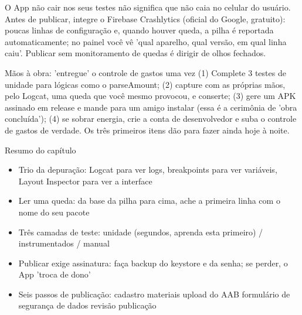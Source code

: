 
O App não cair nos seus testes não significa que não caia no celular do usuário. Antes de publicar, integre o Firebase Crashlytics (oficial do Google, gratuito): poucas linhas de configuração e, quando houver queda, a pilha é reportada automaticamente; no painel você vê 'qual aparelho, qual versão, em qual linha caiu'. Publicar sem monitoramento de quedas é dirigir de olhos fechados.

\begin{tcbpractice}{Mãos à obra: 'entregue' o controle de gastos uma vez}
(1) Complete 3 testes de unidade para lógicas como o parseAmount; (2) capture com as próprias mãos, pelo Logcat, uma queda que você mesmo provocou, e conserte; (3) gere um APK assinado em release e mande para um amigo instalar (essa é a cerimônia de 'obra concluída'); (4) se sobrar energia, crie a conta de desenvolvedor e suba o controle de gastos de verdade. Os três primeiros itens dão para fazer ainda hoje à noite.

\end{tcbpractice}

\begin{tcbsummary}{Resumo do capítulo}
\begin{itemize}
  \item Trio da depuração: Logcat para ver logs, breakpoints para ver variáveis, Layout Inspector para ver a interface
  \item Ler uma queda: da base da pilha para cima, ache a primeira linha com o nome do seu pacote
  \item Três camadas de teste: unidade (segundos, aprenda esta primeiro) / instrumentados / manual
  \item Publicar exige assinatura: faça backup do keystore e da senha; se perder, o App 'troca de dono'
  \item Seis passos de publicação: cadastro materiais upload do AAB formulário de segurança de dados revisão publicação
\end{itemize}

\end{tcbsummary}
